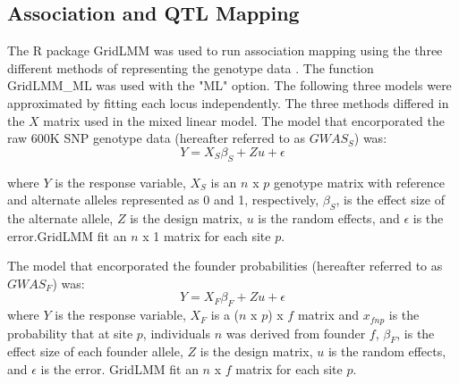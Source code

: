 \documentclass[article,9pt,twocolumn,twoside]{rilabRxiv}
\begin{document}

\subsection{Association and QTL Mapping}
The R package GridLMM was used to run association mapping using the three different methods of representing the genotype data \citep{RN14}. The function GridLMM\_ML was used with the "ML" option.  The following three models were approximated by fitting each locus independently. The three methods differed in the $X$ matrix used in the mixed linear model. The model that encorporated the raw 600K SNP genotype data (hereafter referred to as $GWAS_S$) was:
\begin{equation}
\label{eqn:gridlmm1}
 Y = X_S{\beta_S} + Zu + \epsilon
\end{equation}

where $Y$ is the response variable, $X_S$ is an $n$ x $p$ genotype matrix with reference and alternate alleles represented as 0 and 1, respectively, $\beta_S$, is the effect size of the alternate allele, $Z$ is the design matrix, $u$ is the random effects, and $\epsilon$ is the error.GridLMM fit an $n$ x 1 matrix for each site $p$.

The model that encorporated the founder probabilities (hereafter referred to as $GWAS_F$) was:
\begin{equation}
\label{eqn:gridlmm2}
 Y = X_F{\beta_F} + Zu + \epsilon
\end{equation}
where $Y$ is the response variable, $X_F$ is a ($n$ x $p$) x $f$ matrix and $x_{fnp}$ is the probability that at site $p$, individuals $n$ was derived from founder $f$, $\beta_F$, is the effect size of each founder allele, $Z$ is the design matrix, $u$ is the random effects, and $\epsilon$ is the error. GridLMM fit an $n$ x $f$ matrix for each site $p$.
\end{document}
